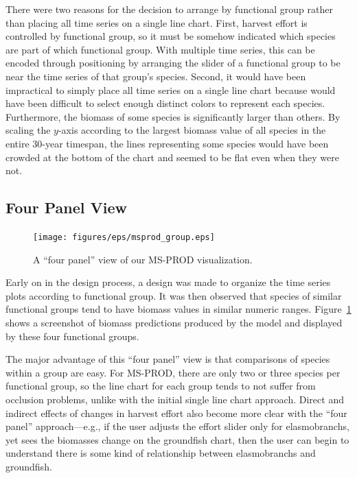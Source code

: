 There were two reasons for the decision to arrange by functional group rather than placing all time series on a single line chart.  First, harvest effort is controlled by functional group, so it must be somehow indicated which species are part of which functional group.  With multiple time series, this can be encoded through positioning by arranging the slider of a functional group to be near the time series of that group's species.  Second, it would have been impractical to simply place all time series on a single line chart because would have been difficult to select enough distinct colors to represent each species.  Furthermore, the biomass of some species is significantly larger than others.  By scaling the $y$-axis according to the largest biomass value of all species in the entire 30-year timespan, the lines representing some species would have been crowded at the bottom of the chart and seemed to be flat even when they were not.

\subsection{Four Panel View}

\begin{figure}[h]
	\centering
	\texttt{[image: figures/eps/msprod\_group.eps]}
	\caption{A ``four panel'' view of our MS-PROD visualization.}
	\label{fig:msprod_group}
\end{figure}

Early on in the design process, a design was made to organize the time series plots according to functional group.  It was then observed that species of similar functional groups tend to have biomass values in similar numeric ranges.  Figure~\ref{fig:msprod_group} shows a screenshot of biomass predictions produced by the model and displayed by these four functional groups.

The major advantage of this ``four panel'' view is that comparisons of species within a group are easy.  For MS-PROD, there are only two or three species per functional group, so the line chart for each group tends to not suffer from occlusion problems, unlike with the initial single line chart approach.  Direct and indirect effects of changes in harvest effort also become more clear with the ``four panel'' approach---e.g., if the user adjusts the effort slider only for elasmobranchs, yet sees the biomasses change on the groundfish chart, then the user can begin to understand there is some kind of relationship between elasmobranchs and groundfish.

